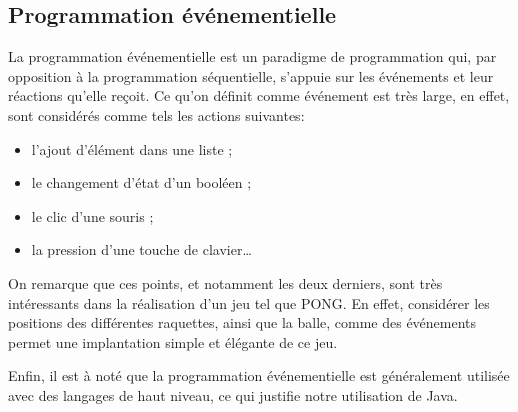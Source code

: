 \documentclass[a4paper,10pt]{article}
\theoremstyle{definition}
\begin{document}
  \subsection{Programmation événementielle}
	La programmation événementielle est un paradigme de programmation qui, par opposition à la programmation séquentielle, s'appuie sur les événements et leur réactions qu'elle reçoit. Ce qu'on définit comme \og événement \fg{} est très large, en effet, sont considérés comme tels les actions suivantes:
	\begin{itemize}
		\item l'ajout d'élément dans une liste ;
		\item le changement d'état d'un booléen ;
		\item le clic d'une souris ;
		\item la pression d'une touche de clavier\dots
	\end{itemize} 
	
	On remarque que ces points, et notamment les deux derniers, sont très intéressants dans la réalisation d'un jeu tel que PONG. En effet, considérer les positions des différentes raquettes, ainsi que la balle, comme des événements permet une implantation simple et élégante de ce jeu.
	
	Enfin, il est à noté que la programmation événementielle est généralement utilisée avec des langages de haut niveau, ce qui justifie notre utilisation de Java.
\end{document}
